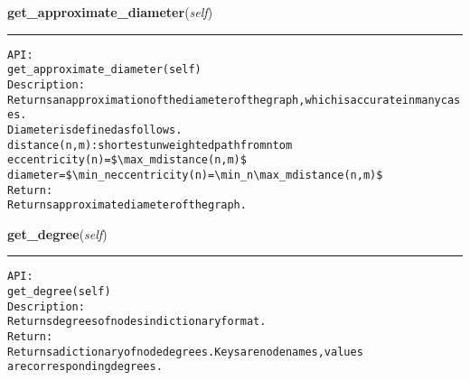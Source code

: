 \hspace{.8\funcindent}\begin{boxedminipage}{\funcwidth}

    \raggedright \textbf{get\_approximate\_diameter}(\textit{self})

    \vspace{-1.5ex}

    \rule{\textwidth}{0.5\fboxrule}
\setlength{\parskip}{2ex}
\begin{alltt}

API:
    get\_approximate\_diameter(self)
Description:
    Returns an approximation of the diameter of the graph, which is accurate in many cases. 
    Diameter is defined as follows.
    distance(n,m): shortest unweighted path from n to m
    eccentricity(n) = \${\textbackslash}max \_m distance(n,m)\$
    diameter = \${\textbackslash}min \_n eccentricity(n) = {\textbackslash}min \_n {\textbackslash}max \_m distance(n,m)\$
Return:
    Returns approximate diameter of the graph.
\end{alltt}

\setlength{\parskip}{1ex}
    \end{boxedminipage}

    \label{coinor:gimpy:graph:Graph:get_degree}

    \vspace{0.5ex}

\hspace{.8\funcindent}\begin{boxedminipage}{\funcwidth}

    \raggedright \textbf{get\_degree}(\textit{self})

    \vspace{-1.5ex}

    \rule{\textwidth}{0.5\fboxrule}
\setlength{\parskip}{2ex}
\begin{alltt}

API:
    get\_degree(self)
Description:
    Returns degrees of nodes in dictionary format.
Return:
    Returns a dictionary of node degrees. Keys are node names, values
    are corresponding degrees.
\end{alltt}

\setlength{\parskip}{1ex}
    \end{boxedminipage}

    \label{coinor:gimpy:graph:Graph:get_diameter}

